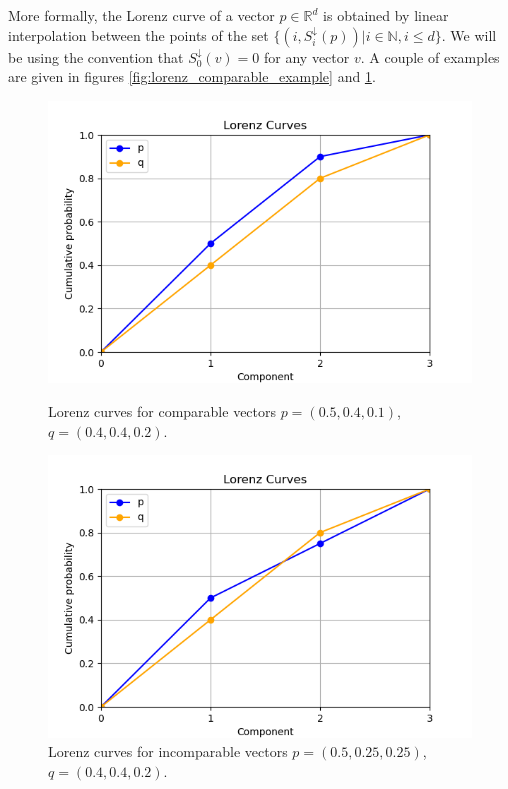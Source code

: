 More formally, the Lorenz curve of a vector $p \in \mathbb{R}^d$ is obtained by linear interpolation between the points of the set $\{(i, S^\downarrow_i(p)) | i \in \mathbb{N}, i \leq d\}$.
We will be using the convention that $S^\downarrow_0 (v) = 0$ for any vector $v$. A couple of examples are given in figures \ref{fig:lorenz_comparable_example} and \ref{fig:lorenz_incomparable_example}.

\begin{figure}[h!]
    \centering
    \begin{minipage}{.48\textwidth}
        \centering
        \includegraphics[scale=0.45]{images/lorenz_comp.png}
        \caption{Lorenz curves for comparable vectors $p = (0.5, 0.4, 0.1)$, $q = (0.4, 0.4, 0.2)$.}
        \label{fig:lorenz_comparable_example}
    \end{minipage}
    \hfill
    \begin{minipage}{0.48\textwidth}
        \centering
        \includegraphics[scale=0.45]{images/lorenz_incomp.png}
        \caption{Lorenz curves for incomparable vectors $p = (0.5, 0.25, 0.25)$, $q = (0.4, 0.4, 0.2)$.}
        \label{fig:lorenz_incomparable_example}
    \end{minipage}
\end{figure}

